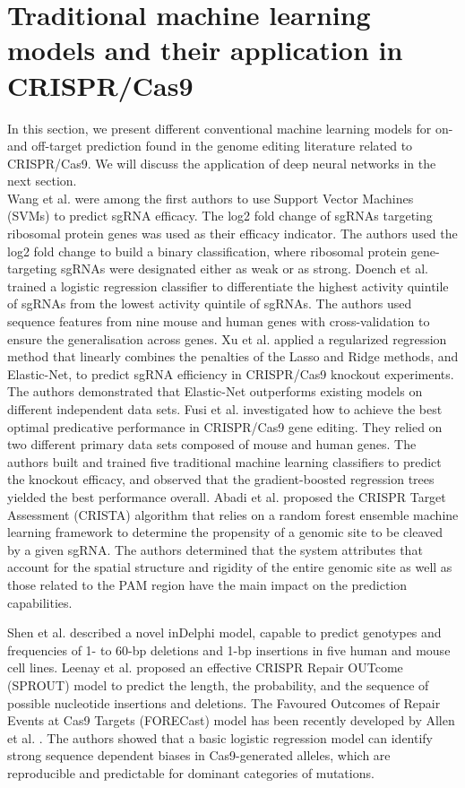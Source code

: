 \documentclass[unnumsec,webpdf,contemporary,large]{oup-authoring-template}
\theoremstyle{thmstyleone}%
\theoremstyle{thmstyletwo}%
\theoremstyle{thmstylethree}%
\begin{document}
\section{Traditional machine learning models and their application in CRISPR/Cas9}
In this section, we present different conventional machine learning models for on- and off-target prediction found in the genome editing literature related to CRISPR/Cas9. We will discuss the application of deep neural networks in the next section. \\
Wang et al. \cite{wang2014genetic} were among the first authors to use Support Vector Machines (SVMs) to predict sgRNA efficacy. The log2 fold change of sgRNAs targeting ribosomal protein genes was used as their efficacy indicator. The authors used the log2 fold change to build a binary classification, where ribosomal protein gene-targeting sgRNAs were designated either as weak or as strong. 
Doench et al. \cite{doench2014rational} trained a logistic regression classifier to differentiate the highest activity quintile of sgRNAs from the lowest activity quintile of sgRNAs. The authors used sequence features from nine mouse and human genes with cross-validation to ensure the generalisation across genes.
Xu et al. \cite{xu2015sequence} applied a regularized regression method that linearly combines the penalties of the Lasso and Ridge methods, and Elastic-Net, to predict sgRNA efficiency in CRISPR/Cas9 knockout experiments. The authors demonstrated that Elastic-Net outperforms existing models on different independent data sets.
Fusi et al. \cite{fusi2015silico} investigated how to achieve the best optimal predicative performance in CRISPR/Cas9 gene editing. They relied on two different primary data sets composed of mouse and human genes. The authors built and trained five traditional machine learning classifiers to predict the knockout efficacy, and observed that the gradient-boosted regression trees yielded the best performance overall.
Abadi et al. \cite{abadi2017machine} proposed the CRISPR Target Assessment (CRISTA) algorithm that relies on a random forest ensemble machine learning framework to determine the propensity of a genomic site to be cleaved by a given sgRNA. The authors determined that the system attributes that account for the spatial structure and rigidity of the entire genomic site as well as those related to the PAM region have the main impact on the prediction capabilities.

Shen et al. \cite{shen2018predictable} described a novel inDelphi model, capable to predict genotypes and frequencies of 1- to 60-bp deletions and 1-bp insertions in five human and mouse cell lines. Leenay et al. \cite{leenay2019large} proposed an effective CRISPR Repair OUTcome (SPROUT) model to predict the length, the probability, and the sequence of possible nucleotide insertions and deletions. The Favoured Outcomes of Repair Events at Cas9 Targets (FORECast) model has been recently developed by Allen et al. \cite{allen2019predicting}. The authors showed that a basic logistic regression model can identify strong sequence dependent biases in Cas9-generated alleles, which are reproducible and predictable for dominant categories of mutations. 
\end{document}
